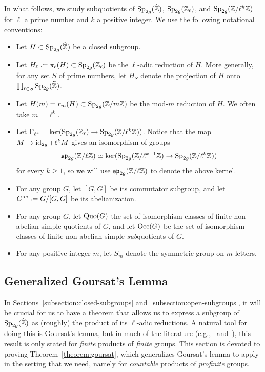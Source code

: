 In what follows, we study subquotients of $\operatorname{Sp}_{2g}(\widehat{\mathbb Z})$, $\operatorname{Sp}_{2g}(\mathbb Z_\ell)$, and $\operatorname{Sp}_{2g}(\mathbb Z/ \ell^k \mathbb Z)$ for $\ell$ a prime number and $k$ a positive integer. We use the following notational conventions:
\begin{itemize}
\item Let $H\subset \operatorname{Sp}_{2g}(\widehat{\mathbb Z})$ be a closed subgroup.
\item Let $H_{\ell} \defeq \pi_\ell(H) \subset \Sp_{2g}(\ZZ_\ell)$ be the $\ell$-adic reduction of $H$. More generally, for any set $S$ of prime numbers, let $H_S$ denote the projection of $H$ onto $\prod_{\ell \in S} \operatorname{Sp}_{2g}(\widehat{\mathbb Z})$.
\item Let $H(m) = r_{m}(H) \subset \operatorname{Sp}_{2g}(\mathbb Z/m \mathbb Z)$ be the mod-$m$ reduction of $H$. We often take $m = \ell^k$.
\item Let $\Gamma_{\ell^k} = \ker(\operatorname{Sp}_{2g}(\mathbb Z_\ell) \to \operatorname{Sp}_{2g}(\mathbb Z/ \ell^k \mathbb Z))$. Notice that the map $M \mapsto \operatorname{id}_{2g} + \ell^k M$ gives an isomorphism of groups
$$\mathfrak{sp}_{2g}(\mathbb Z/ \ell \mathbb Z) \simeq \ker(\operatorname{Sp}_{2g}(\mathbb Z/\ell^{k+1} \mathbb Z) \to \operatorname{Sp}_{2g}(\mathbb Z/ \ell^k \mathbb Z))$$
for every $k \geq 1$, so we will use $\mathfrak{sp}_{2g}(\mathbb Z/\ell\mathbb Z)$ to denote the above kernel.
\item For any group $G$, let $[G,G]$ be its commutator subgroup, and let $G^{\ab} \defeq G/{ {[G,G]}}$ be its abelianization.
\item For any group $G$, let $\operatorname{Quo}(G)$ the set of isomorphism classes of finite non-abelian simple quotients of $G$, and let $\operatorname{Occ}(G)$ be the set of isomorphism classes of finite non-abelian simple \emph{sub}quotients of $G$.
\item For any positive integer $m$, let $S_m$ denote the symmetric group on $m$ letters.
\end{itemize}

\subsection{Generalized Goursat's Lemma}

In Sections~\ref{subsection:closed-subgroups} and~\ref{subsection:open-subgroups}, it will be crucial for us to have a theorem that allows us to express a subgroup of $\operatorname{Sp}_{2g}(\widehat{\mathbb Z})$ as (roughly) the product of its $\ell$-adic reductions. A natural tool for doing this is Goursat's lemma, but in much of the literature (e.g.,~\cite[Lemma 5.2.2]{ribbit} and~\cite[Lemma A.4]{zywina2010elliptic}), this result is only stated for \emph{finite} products of \emph{finite} groups. This section is devoted to proving Theorem~\ref{theorem:goursat}, which generalizes Goursat's lemma to apply in the setting that we need, namely for \emph{countable} products of \emph{profinite} groups.
	
